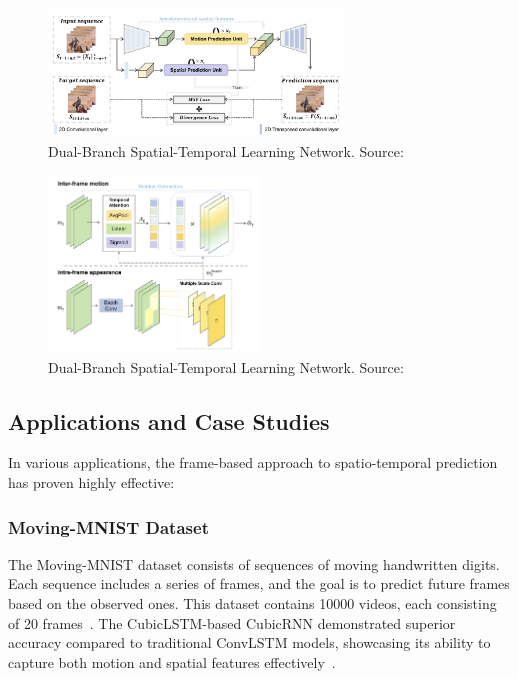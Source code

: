 \documentclass[12pt,oneside]{book} %
\begin{document}
\begin{figure}[H]
    \centering
    \includegraphics[width=0.7\textwidth]{figures/dual-branch-architecture.png}
    \caption{Dual-Branch Spatial-Temporal Learning Network. Source:~\citet{DualBranchSpatialTemporalLearningNetworkVideoPrediction}}\label{fig:dual-branch-spatial-temporal-learning-network}
\end{figure}

\begin{figure}[H]
    \centering
    \includegraphics[width=0.5\textwidth]{figures/dual-branch-inter-intra-frames.png}
    \caption{Dual-Branch Spatial-Temporal Learning Network. Source:~\citet{SurveyDLOD}}\label{fig:dual-branch-inter-intra-frames}
\end{figure}

\subsection*{Applications and Case Studies}

In various applications, the frame-based approach to spatio-temporal prediction
has proven highly effective:

\subsubsection*{Moving-MNIST Dataset}

The Moving-MNIST dataset consists of sequences of moving handwritten digits.
Each sequence includes a series of frames, and the goal is to predict future
frames based on the observed ones. This dataset contains 10000 videos, each
consisting of 20 frames~\cite{DBLP:journals/corr/SrivastavaMS15}. The
CubicLSTM-based CubicRNN demonstrated superior accuracy compared to traditional
ConvLSTM models, showcasing its ability to capture both motion and spatial
features effectively~\cite{ CubicLSTMsVideoPrediction}.
\end{document}
